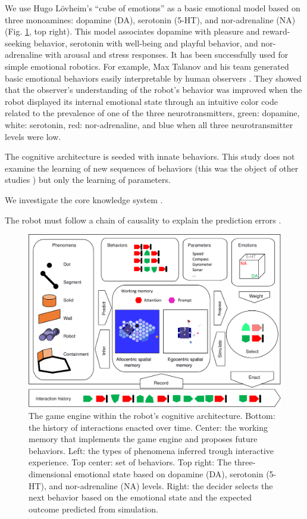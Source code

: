 \documentclass[runningheads]{llncs}
\begin{document}
We use Hugo Lövheim's ``cube of emotions'' \cite{lovheim_new_2012} as a basic emotional model based on three monoamines: dopamine (DA), serotonin (5-HT), and nor-adrenaline (NA) (Fig. \ref{fig:geith}, top right).
This model associates dopamine with pleasure and reward-seeking behavior, serotonin with well-being and playful behavior, and nor-adrenaline with arousal and stress responses.
It has been successfully used for simple emotional robotics.
For example, Max Talanov and his team generated basic emotional behaviors easily interpretable by human observers \cite{chebotareva_emotional_2019}. 
They showed that the observer's understanding of the robot's behavior was improved when the robot displayed its internal emotional state through an intuitive color code related to the prevalence of one of the three neurotransmitters, green: dopamine, white: serotonin, red: nor-adrenaline, and blue when all three neurotransmitter levels were low. 

The cognitive architecture is seeded with innate behaviors. 
This study does not examine the learning of new sequences of behaviors (this was the object of other studies \cite{georgeon_cash_2019}) but only the learning of parameters. 

We investigate the core knowledge system \cite{spelke_core_2012}.

The robot must follow a chain of causality to explain the prediction errors \cite{thorisson_explanation_2021}.

\begin{figure}
	\includegraphics[width=\textwidth]{Figure_geith.pdf}
	\caption{The game engine within the robot's cognitive architecture.
	Bottom: the history of interactions enacted over time.
	Center: the working memory that implements the game engine and proposes future behaviors.
	Left: the types of phenomena inferred trough interactive experience.
	Top center: set of behaviors.
	Top right: The three-dimensional emotional state based on dopamine (DA), serotonin (5-HT), and nor-adrenaline (NA) levels.
	Right: the decider selects the next behavior based on the emotional state and the expected outcome predicted from simulation.} \label{fig:geith}
\end{figure}
\end{document}
